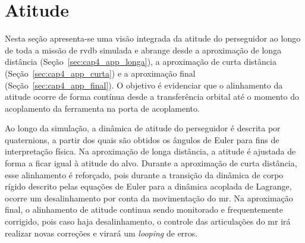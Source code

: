 \section{Atitude}
\label{sec:cap4_atitude}

Nesta seção apresenta-se uma visão integrada da atitude do perseguidor ao longo de toda a missão de \gls{rvdb} simulada e abrange desde a aproximação de longa distância (Seção~\ref{sec:cap4_app_longa}), a aproximação de curta distância (Seção~\ref{sec:cap4_app_curta}) e a aproximação final (Seção~\ref{sec:cap4_app_final}).
O objetivo é evidenciar que o alinhamento da atitude ocorre de forma contínua desde a transferência orbital até o momento do acoplamento da ferramenta na porta de acoplamento.

Ao longo da simulação, a dinâmica de atitude do perseguidor é descrita por quaternions, a partir dos quais são obtidos os ângulos de Euler para fins de interpretação física.
Na aproximação de longa distância, a atitude é ajustada de forma a ficar igual à atitude do alvo.
Durante a aproximação de curta distância, esse alinhamento é reforçado, pois durante a transição da dinâmica de corpo rígido descrito pelas equações de Euler para a dinâmica acoplada de Lagrange, ocorre um desalinhamento por conta da movimentação do \gls{mr}.
Na aproximação final, o alinhamento de atitude continua sendo monitorado e frequentemente corrigido, pois caso haja desalinhamento, o controle das articulações do \gls{mr} irá realizar novas correções e virará um \emph{looping} de erros.


